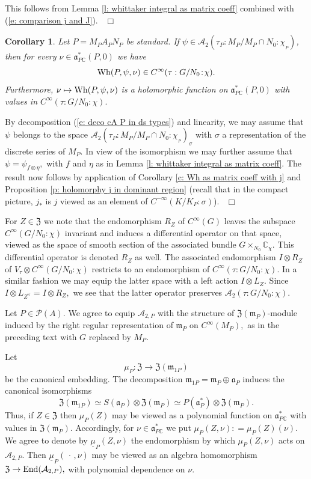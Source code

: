 \documentclass[12pt,a4paper]{article}
\newtheorem{Cor}[Thm]{Corollary}
\newenvironment{cor}[0]{\begin{Cor}\noindent}%
{\end{Cor}}
\def\proof{\par\noindent{\it Proof.}{\ }{\ }}
\def\qed{~\hfill\hbox{$\Box$}\medbreak}
\def\msy#1{{\mathbb #1}}
\def\C{{\msy C}}
\def\gs{\sigma}
\def\got#1{\mathfrak #1}
\def\fa{{\got a}}
\def\fm{{\got m}}
\def\to{\rightarrow}
\def\End{{\rm End}}
\def\iC{{\scriptscriptstyle \C}}
\def\cA{{\mathcal A}}
\def\cP{{\mathcal P}}
\numberwithin{Thm}{section}
\numberwithin{equation}{section}
\def\dotvar{\, \cdot\,}
\def\Vtau{V_\tau}
\def\fZ{{\mathfrak Z}}
\def\Wh{{\rm Wh}}
\def\faPdc{{\fa_{P\iC}^*}}
\def\faPd{{\fa_P^*}}
\numberwithin{equation}{section}
\def\fZ{{\mathfrak Z}}
\def\faPdc{\fa_{P\iC}^*}
\def\cchiP{\cchi_{{\!}_P} }
\def\col{\!:\!}
\def\umu{\underline{\mu}}
\def\cchi{\chi}
\def\gsP{\gs}%
\def\veec{\vee}%
\begin{document}
\proof 
This follows from Lemma \ref{l: whittaker integral as matrix coeff} combined with
(\ref{e: comparison j and J}).
\qed

\begin{cor}
\label{c: initial holomorphy Wh}
Let $P =M_PA_P N_P$ be standard.  
If  $\psi \in \cA_2(\tau_P: M_P/M_P\cap N_0: \cchiP)$, 
then for every $\nu \in \faPdc(P,0)$ we have  
$$ 
\Wh(P, \psi,\nu ) \in C^\infty(\tau: G/N_0\col\cchi).
$$ 
Furthermore, $\nu \mapsto \Wh(P ,\psi,\nu )$ is a holomorphic 
function on $\faPdc(P,0)$ with values in $C^\infty(\tau: G/N_0\col\cchi).$ 
\end{cor}

%
\proof 
By decomposition (\ref{e: deco cA P in ds types}) and linearity,
we may assume that $\psi$ belongs to the space $\cA_2(\tau_P: M_P/M_P\cap N_0: \cchiP)_\gs$ 
with $\gs$ a representation of the discrete series of $M_P.$ In view of the isomorphism
we may further assume that $\psi = \psi_{f \otimes \eta},$ with $f$ and $\eta$ as in Lemma
\ref{l: whittaker integral as matrix coeff}. The result now follows by application of 
Corollary \ref{c: Wh as matrix coeff with j} and Proposition \ref{p: holomorphy j in dominant region}
(recall that in the compact picture, $j_*$ is $j$ viewed as an element of $C^{-\infty}(K/K_P:\gsP)$). 
\qed

For $Z \in \fZ$ we note that the endomorphism $R_Z$ of $C^\infty(G)$ 
leaves the subspace $C^\infty(G/N_0 \col\cchi)$ invariant 
and induces a differential operator on that space, viewed as the space
of smooth section of the associated bundle $G\times_{N_0}\C_\cchi.$ This differential 
operator is denoted $R_Z$ as well.
The associated endomorphism $I \otimes R_Z$ of $\Vtau\otimes C^\infty(G/N_0\col \cchi)$ 
restricts to an endomorphism of $C^\infty(\tau: G/N_0\col \cchi).$ 
In a similar fashion we may equip the latter space with a left action $I \otimes L_Z.$ 
Since $I \otimes L_{Z^\veec} = I \otimes R_Z,$ we see that the latter operator 
preserves $\cA_{2}(\tau: G/N_0\col \cchi).$ 

Let $P \in \cP(A).$ We agree to equip $\cA_{2,P}$ with the structure 
of $\fZ(\fm_P)$-module induced by the right regular representation of
$\fm_P$ on $C^\infty(M_P),$ as in the preceding text with $G$ replaced by $M_{P}.$ 


Let 
$$ 
\mu_P: \fZ \to \fZ(\fm_{1P})
$$ 
be the canonical embedding. The decomposition $\fm_{1P} = \fm_P \oplus \fa_P$ 
induces the canonical isomorphisms
$$ 
\fZ(\fm_{1P}) \simeq  S(\fa_P) \otimes \fZ(\fm_P)  \simeq P(\faPd) \otimes \fZ(\fm_P).
$$ 
Thus, if $Z \in \fZ$ then $\mu_P(Z)$ may be viewed as a polynomial
function on $\faPdc$ with values in $\fZ(\fm_P).$ Accordingly, for 
$\nu \in \faPdc$ we put $\mu_P(Z, \nu): = \mu_P(Z)(\nu).$ 
We agree to denote by $\umu_P(Z,\nu)$ the endomorphism
by which $\mu_P(Z,\nu)$ acts on $\cA_{2,P}.$ Then $\umu_P(\dotvar ,\nu)$ may be viewed as 
an algebra homomorphism $\fZ \to \End(\cA_{2,P}),$ with polynomial dependence on $\nu.$ 
\end{document}
